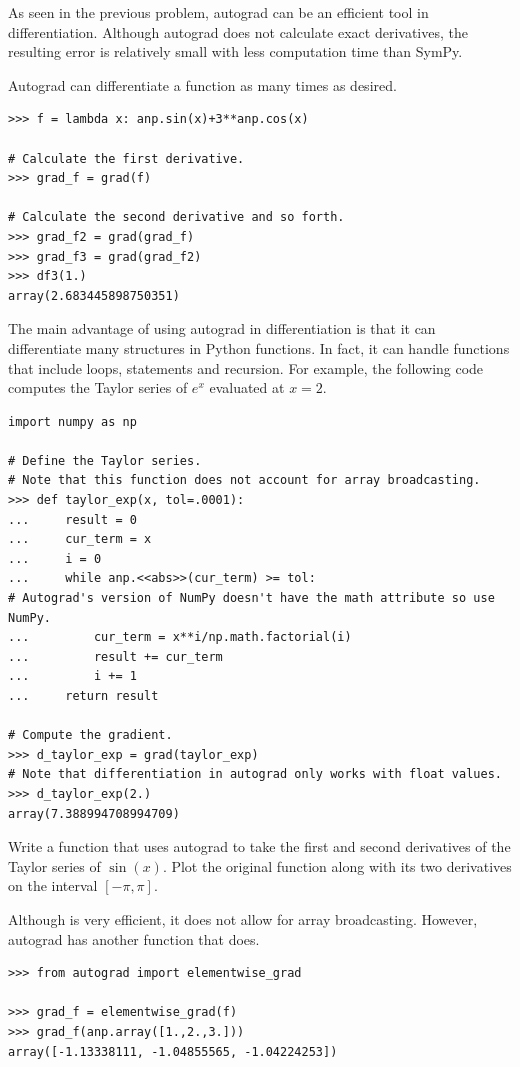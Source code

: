 As seen in the previous problem, autograd can be an efficient tool in differentiation.
Although autograd does not calculate exact derivatives, the resulting error is relatively small with less computation time than SymPy.

Autograd can differentiate a function as many times as desired.

\begin{lstlisting}
>>> f = lambda x: anp.sin(x)+3**anp.cos(x)

# Calculate the first derivative.
>>> grad_f = grad(f)

# Calculate the second derivative and so forth.
>>> grad_f2 = grad(grad_f)
>>> grad_f3 = grad(grad_f2)
>>> df3(1.)
array(2.683445898750351)
\end{lstlisting}

The main advantage of using autograd in differentiation is that it can differentiate many structures in Python functions.
In fact, it can handle functions that include loops,  statements and recursion.
For example, the following code computes the Taylor series of $e^{x}$ evaluated at $x=2$.

\begin{lstlisting}
import numpy as np

# Define the Taylor series.
# Note that this function does not account for array broadcasting.
>>> def taylor_exp(x, tol=.0001):
... 	result = 0
...		cur_term = x
...		i = 0
...		while anp.<<abs>>(cur_term) >= tol:
# Autograd's version of NumPy doesn't have the math attribute so use NumPy.
...			cur_term = x**i/np.math.factorial(i)
...			result += cur_term
...			i += 1
...		return result

# Compute the gradient.
>>> d_taylor_exp = grad(taylor_exp)
# Note that differentiation in autograd only works with float values.
>>> d_taylor_exp(2.)
array(7.388994708994709)
\end{lstlisting}

\begin{problem}
Write a function that uses autograd to take the first and second derivatives of the Taylor series of $\sin\left(x\right)$.
Plot the original function along with its two derivatives on the interval $[-\pi,\pi]$.
\end{problem}

Although  is very efficient, it does not allow for array broadcasting.
However, autograd has another function  that does.

\begin{lstlisting}
>>> from autograd import elementwise_grad

>>> grad_f = elementwise_grad(f)
>>> grad_f(anp.array([1.,2.,3.]))
array([-1.13338111, -1.04855565, -1.04224253])
\end{lstlisting}

